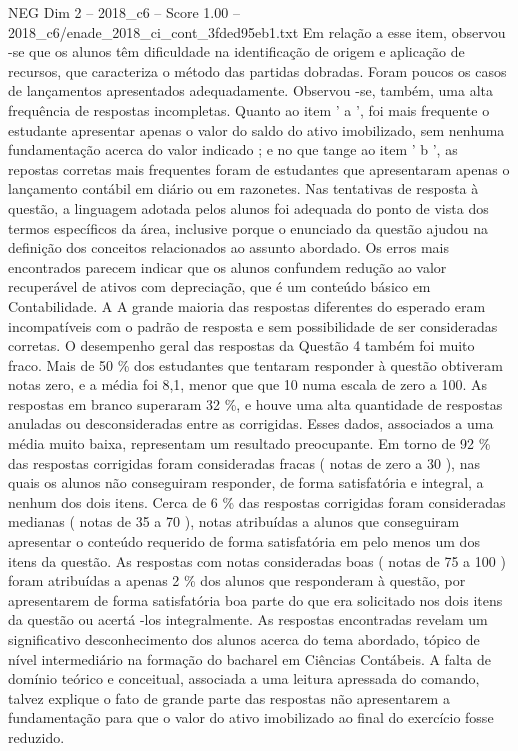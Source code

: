 \begin{textsample}{NEG Dim 2 – 2018\_c6 – Score 1.00 – 2018\_c6/enade\_2018\_ci\_cont\_3fded95eb1.txt}
Em relação a esse item, observou -se que os alunos têm dificuldade na identificação de origem e aplicação de recursos, que caracteriza o método das partidas dobradas.
Foram poucos os casos de lançamentos apresentados adequadamente.
Observou -se, também, uma alta frequência de respostas incompletas.
Quanto ao item ' a ', foi mais frequente o estudante apresentar apenas o valor do saldo do ativo imobilizado, sem nenhuma fundamentação acerca do valor indicado ; e no que tange ao item ' b ', as repostas corretas mais frequentes foram de estudantes que apresentaram apenas o lançamento contábil em diário ou em razonetes.
Nas tentativas de resposta à questão, a linguagem adotada pelos alunos foi adequada do ponto de vista dos termos específicos da área, inclusive porque o enunciado da questão ajudou na definição dos conceitos relacionados ao assunto abordado.
Os erros mais encontrados parecem indicar que os alunos confundem redução ao valor recuperável de ativos com depreciação, que é um conteúdo básico em Contabilidade.
A A grande maioria das respostas diferentes do esperado eram incompatíveis com o padrão de resposta e sem possibilidade de ser consideradas corretas.
O desempenho geral das respostas da Questão 4 também foi muito fraco.
Mais de 50 \% dos estudantes que tentaram responder à questão obtiveram notas zero, e a média foi 8,1, menor que que 10 numa escala de zero a 100.
As respostas em branco superaram 32 \%, e houve uma alta quantidade de respostas anuladas ou desconsideradas entre as corrigidas.
Esses dados, associados a uma média muito baixa, representam um resultado preocupante.
Em torno de 92 \% das respostas corrigidas foram consideradas fracas ( notas de zero a 30 ), nas quais os alunos não conseguiram responder, de forma satisfatória e integral, a nenhum dos dois itens.
Cerca de 6 \% das respostas corrigidas foram consideradas medianas ( notas de 35 a 70 ), notas atribuídas a alunos que conseguiram apresentar o conteúdo requerido de forma satisfatória em pelo menos um dos itens da questão.
As respostas com notas consideradas boas ( notas de 75 a 100 ) foram atribuídas a apenas 2 \% dos alunos que responderam à questão, por apresentarem de forma satisfatória boa parte do que era solicitado nos dois itens da questão ou acertá -los integralmente.
As respostas encontradas revelam um significativo desconhecimento dos alunos acerca do tema abordado, tópico de nível intermediário na formação do bacharel em Ciências Contábeis.
A falta de domínio teórico e conceitual, associada a uma leitura apressada do comando, talvez explique o fato de grande parte das respostas não apresentarem a fundamentação para que o valor do ativo imobilizado ao final do exercício fosse reduzido.

\end{textsample}

